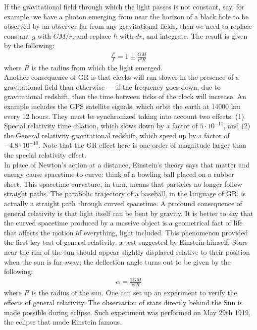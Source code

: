\documentclass[11pt]{article}
\theoremstyle{break}
\theoremstyle{break}
\begin{document}
If the gravitational field through which the light passes is not constant, say, for example, we have a photon emerging from near the horizon of a black hole to be observed by an observer far from any gravitational fields, then we need to replace constant $g$ with $GM/r$, and replace $h$ with $dr$, and integrate. The result is given by the following:
\begin{align*}
\frac{f'}{f} = 1\pm \frac{GM}{c^2 R}
\end{align*}
where $R$ is the radius from which the light emerged.\\


Another consequence of GR is that clocks will run slower in the presence of a gravitational field than otherwise — if the frequency goes down, due to gravitational redshift, then the time between ticks of the clock will increase. An example includes the GPS satellite signals, which orbit the earth at 14000 km every 12 hours. They must be synchronized taking into account two effects: (1) Special relativity time dilation, which slows down by a factor of $5\cdot 10^{-11}$, and (2) the General relativity gravitational redshift, which speed up by a factor of $-4.8\cdot10^{-10}$. Note that the GR effect here is one order of magnitude larger than the special relativity effect.\\


In place of Newton's action at a distance, Einstein's theory says that matter and energy cause spacetime to curve: think of a bowling ball placed on a rubber sheet. This spacetime curvature, in turn, means that particles no longer follow straight paths. The parabolic trajectory of a baseball,
in the language of GR, is actually a straight path through curved spacetime.  A profound consequence of general relativity is that light itself can be bent by gravity. It is better
to say that the curved spacetime produced by a massive object is a geometrical fact of life that
affects the motion of everything, light included. This phenomenon provided the first key test of general relativity, a test suggested by Einstein himself. Stars near the rim of the sun should
appear slightly displaced relative to their position when the sun is far away; the deflection angle turns out to be given by the following:
\begin{align*}
\alpha = \frac{2GM}{c^2 R}
\end{align*}
where $R$ is the radius of the sun. One can set up an experiment to verify the effects of general relativity. The observation of stars directly behind the Sun is made possible during eclipse. Such experiment was performed on May 29th 1919, the eclipse that made Einstein famous. \\
\end{document}
